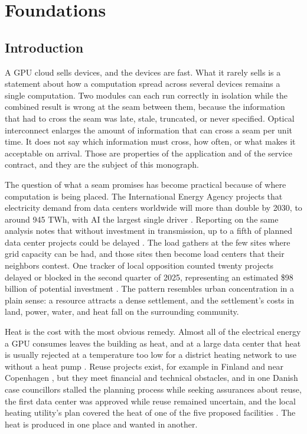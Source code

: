 \documentclass[11pt,openany]{book}
\theoremstyle{remark}
\begin{document}
\part{Foundations}

\chapter{Introduction}

A GPU cloud sells devices, and the devices are fast. What it rarely sells is a statement about how a computation spread across several devices remains a single computation. Two modules can each run correctly in isolation while the combined result is wrong at the seam between them, because the information that had to cross the seam was late, stale, truncated, or never specified. Optical interconnect enlarges the amount of information that can cross a seam per unit time. It does not say which information must cross, how often, or what makes it acceptable on arrival. Those are properties of the application and of the service contract, and they are the subject of this monograph.

The question of what a seam promises has become practical because of where computation is being placed. The International Energy Agency projects that electricity demand from data centers worldwide will more than double by 2030, to around 945 TWh, with AI the largest single driver \cite{iea}. Reporting on the same analysis notes that without investment in transmission, up to a fifth of planned data center projects could be delayed \cite{dcd-iea}. The load gathers at the few sites where grid capacity can be had, and those sites then become load centers that their neighbors contest. One tracker of local opposition counted twenty projects delayed or blocked in the second quarter of 2025, representing an estimated \$98 billion of potential investment \cite{eli}. The pattern resembles urban concentration in a plain sense: a resource attracts a dense settlement, and the settlement's costs in land, power, water, and heat fall on the surrounding community.

Heat is the cost with the most obvious remedy. Almost all of the electrical energy a GPU consumes leaves the building as heat, and at a large data center that heat is usually rejected at a temperature too low for a district heating network to use without a heat pump \cite{qarnot}. Reuse projects exist, for example in Finland and near Copenhagen \cite{eli}, but they meet financial and technical obstacles, and in one Danish case councillors stalled the planning process while seeking assurances about reuse, the first data center was approved while reuse remained uncertain, and the local heating utility's plan covered the heat of one of the five proposed facilities \cite{cw}. The heat is produced in one place and wanted in another.
\end{document}
